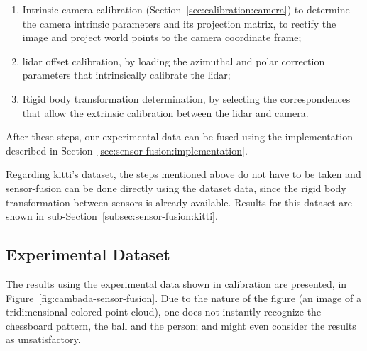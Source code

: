 \begin{enumerate}
	\item Intrinsic camera calibration (Section~\ref{sec:calibration:camera}) to determine the camera intrinsic parameters and its projection matrix, to rectify the image and project world points to the camera coordinate frame;
	\item \ac{lidar} offset calibration, by loading the azimuthal and polar correction parameters that intrinsically calibrate the \ac{lidar};
	\item Rigid body transformation determination, by selecting the correspondences that allow the extrinsic calibration between the \ac{lidar} and camera.
\end{enumerate}

After these steps, our experimental data can be fused using the implementation described in Section~\ref{sec:sensor-fusion:implementation}.

Regarding \ac{kitti}'s dataset, the steps mentioned above do not have to be taken and sensor-fusion can be done directly using the dataset data, since the rigid body transformation between sensors is already available. Results for this dataset are shown in sub-Section~\ref{subsec:sensor-fusion:kitti}.

\subsection{Experimental Dataset}
\label{subsec:sensor-fusion:experimental-dataset}
The results using the experimental data shown in calibration are presented, in Figure~\ref{fig:cambada-sensor-fusion}. Due to the nature of the figure (an image of a tridimensional colored point cloud), one does not instantly recognize the chessboard pattern, the ball and the person; and might even consider the results as unsatisfactory. 

